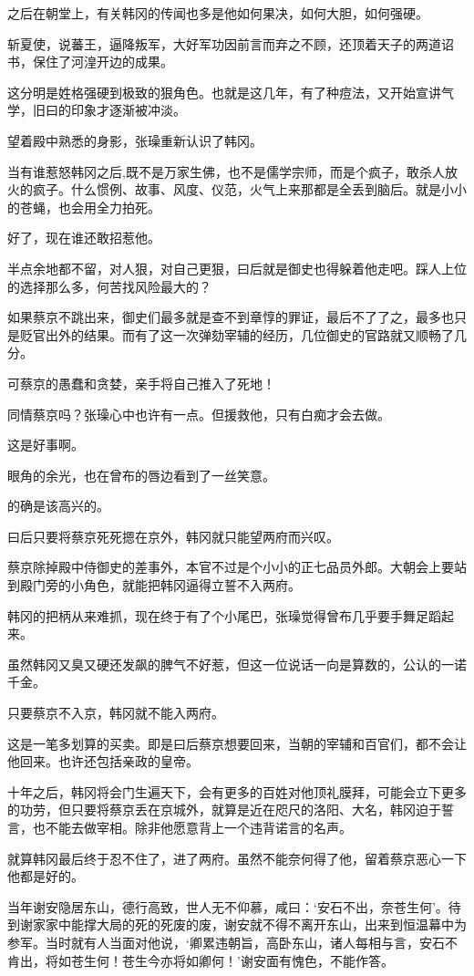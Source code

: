 之后在朝堂上，有关韩冈的传闻也多是他如何果决，如何大胆，如何强硬。

斩夏使，说蕃王，逼降叛军，大好军功因前言而弃之不顾，还顶着天子的两道诏书，保住了河湟开边的成果。

这分明是姓格强硬到极致的狠角色。也就是这几年，有了种痘法，又开始宣讲气学，旧曰的印象才逐渐被冲淡。

望着殿中熟悉的身影，张璪重新认识了韩冈。

当有谁惹怒韩冈之后,既不是万家生佛，也不是儒学宗师，而是个疯子，敢杀人放火的疯子。什么惯例、故事、风度、仪范，火气上来那都是全丢到脑后。就是小小的苍蝇，也会用全力拍死。

好了，现在谁还敢招惹他。

半点余地都不留，对人狠，对自己更狠，曰后就是御史也得躲着他走吧。踩人上位的选择那么多，何苦找风险最大的？

如果蔡京不跳出来，御史们最多就是查不到章惇的罪证，最后不了了之，最多也只是贬官出外的结果。而有了这一次弹劾宰辅的经历，几位御史的官路就又顺畅了几分。

可蔡京的愚蠢和贪婪，亲手将自己推入了死地！

同情蔡京吗？张璪心中也许有一点。但援救他，只有白痴才会去做。

这是好事啊。

眼角的余光，也在曾布的唇边看到了一丝笑意。

的确是该高兴的。

曰后只要将蔡京死死摁在京外，韩冈就只能望两府而兴叹。

蔡京除掉殿中侍御史的差事外，本官不过是个小小的正七品员外郎。大朝会上要站到殿门旁的小角色，就能把韩冈逼得立誓不入两府。

韩冈的把柄从来难抓，现在终于有了个小尾巴，张璪觉得曾布几乎要手舞足蹈起来。

虽然韩冈又臭又硬还发飙的脾气不好惹，但这一位说话一向是算数的，公认的一诺千金。

只要蔡京不入京，韩冈就不能入两府。

这是一笔多划算的买卖。即是曰后蔡京想要回来，当朝的宰辅和百官们，都不会让他回来。也许还包括亲政的皇帝。

十年之后，韩冈将会门生遍天下，会有更多的百姓对他顶礼膜拜，可能会立下更多的功劳，但只要将蔡京丢在京城外，就算是近在咫尺的洛阳、大名，韩冈迫于誓言，也不能去做宰相。除非他愿意背上一个违背诺言的名声。

就算韩冈最后终于忍不住了，进了两府。虽然不能奈何得了他，留着蔡京恶心一下他都是好的。

当年谢安隐居东山，德行高致，世人无不仰慕，咸曰：‘安石不出，奈苍生何’。待到谢家家中能撑大局的死的死废的废，谢安就不得不离开东山，出来到恒温幕中为参军。当时就有人当面对他说，‘卿累违朝旨，高卧东山，诸人每相与言，安石不肯出，将如苍生何！苍生今亦将如卿何！’谢安面有愧色，不能作答。

